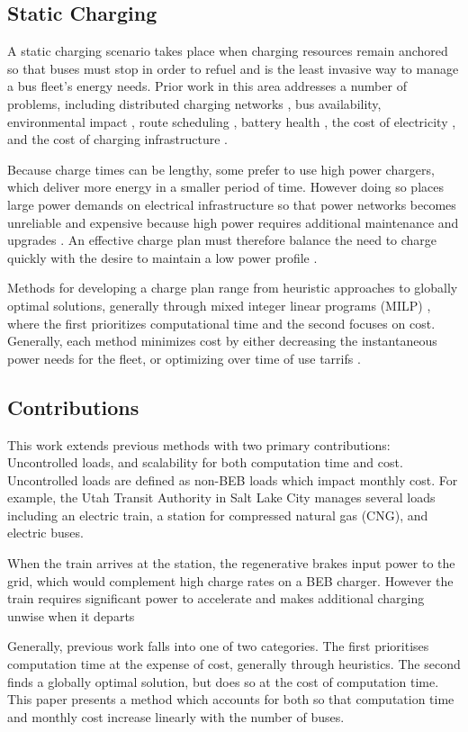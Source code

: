 \subsection{Static Charging}
\par A static charging scenario takes place when charging resources remain anchored so that buses must stop in order to refuel and is the least invasive way to manage a bus fleet's energy needs. Prior work in this area addresses a number of problems, including distributed charging networks \cite{Nimalsiri2020}, bus availability, environmental impact \cite{zhou_bi-objective_2021}, route scheduling \cite{Rinalde_Mixed_2020}, battery health \cite{houbbadi_optimal_2019}, the cost of electricity \cite{Leou_optimal_2017}, and the cost of charging infrastructure \cite{Wei2018}.
\par Because charge times can be lengthy, some prefer to use high power chargers, which deliver more energy in a smaller period of time. However doing so places large power demands on electrical infrastructure \cite{stahleder_impact_2019} so that power networks becomes unreliable \cite{deb_impact_2017} and expensive because high power requires additional maintenance and upgrades \cite{boonraksa_impact_2019}. An effective charge plan must therefore balance the need to charge quickly with the desire to maintain a low power profile \cite{ojer_development_2020}.
\par Methods for developing a charge plan range from heuristic approaches \cite{qin_numerical_2016} \cite{Wang2019} to globally optimal solutions, generally through mixed integer linear programs (MILP) \cite{bagherinezhad_spatio-temporal_2020}, where the first prioritizes computational time and the second focuses on cost. Generally, each method minimizes cost by either decreasing the instantaneous power needs for the fleet, or optimizing over time of use tarrifs \cite{He_2019_Fast}.  
\subsection{Contributions}
\par  This work extends previous methods with two primary contributions: Uncontrolled loads, and scalability for both computation time and cost. Uncontrolled loads are defined as non-BEB loads which impact monthly cost. For example, the Utah Transit Authority in Salt Lake City manages several loads including an electric train, a station for compressed natural gas (CNG), and electric buses. 
\par When the train arrives at the station, the regenerative brakes input power to the grid, which would complement high charge rates on a BEB charger. However the train requires significant power to accelerate and makes additional charging unwise when it departs\par Generally, previous work falls into one of two categories. The first prioritises computation time at the expense of cost, generally through heuristics. The second finds a globally optimal solution, but does so at the cost of computation time. This paper presents a method which accounts for both so that computation time and monthly cost increase linearly with the number of buses. 
